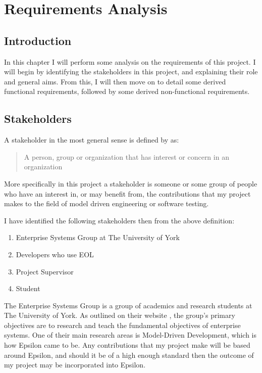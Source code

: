 \chapter{Requirements Analysis}

\section{Introduction}

In this chapter I will perform some analysis on the requirements of this project. I will begin by identifying the stakeholders in this project, and explaining their role and general aims. From this, I will then move on to detail some derived functional requirements, followed by some derived non-functional requirements.

\section{Stakeholders}
A stakeholder in the most general sense is defined by \citet{stakeholderDef} as:

\begin{quote}
	A person, group or organization that has interest or concern in an organization
\end{quote}

More specifically in this project a stakeholder is someone or some group of people who have an interest in, or may benefit from, the contributions that my project makes to the field of model driven engineering or software testing.

I have identified the following stakeholders then from the above definition:

\begin{enumerate}
\item Enterprise Systems Group at The University of York
\item Developers who use EOL
\item Project Supervisor
\item Student
\end{enumerate}

The Enterprise Systems Group is a group of academics and research students at The University of York. As outlined on their website \cite{ESG}, the group's primary objectives are to research and teach the fundamental objectives of enterprise systems. One of their main research areas is Model-Driven Development, which is how Epsilon came to be. Any contributions that my project make will be based around Epsilon, and should it be of a high enough standard then the outcome of my project may be incorporated into Epsilon.

